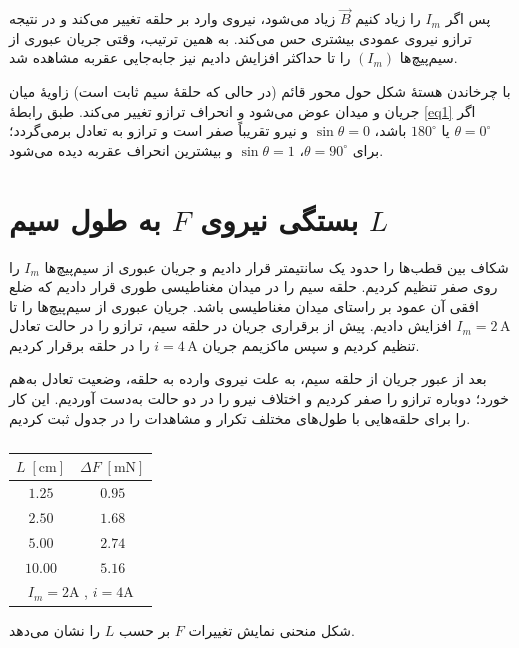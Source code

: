 \documentclass[a4paper, 11pt]{article}
\begin{document}
پس اگر $I_m$  را زیاد کنیم $\vec B$ زیاد می‌شود، نیروی وارد بر حلقه تغییر می‌کند و در نتیجه ترازو نیروی عمودی بیشتری حس می‌کند. به همین ترتیب، وقتی جریان عبوری از سیم‌پیچ‌ها $(I_m)$ را تا حداکثر  افزایش دادیم نیز جابه‌جایی عقربه مشاهده شد.

با چرخاندن هستهٔ  شکل حول محور قائم (در حالی که حلقهٔ سیم ثابت است) زاویهٔ میان جریان و میدان عوض می‌شود و انحراف ترازو تغییر می‌کند. طبق رابطهٔ \ref{eq1} اگر $\theta = 0^\circ$ یا $180^\circ$ باشد، $\sin\theta = 0$ و نیرو تقریباً صفر است و ترازو به تعادل برمی‌گردد؛ برای $\theta = 90^\circ$، $\sin\theta = 1$ و بیشترین انحراف عقربه دیده می‌شود.

\section{بستگی نیروی $F$ به طول سیم $L$}

شکاف بین قطب‌ها را حدود یک سانتیمتر قرار دادیم و جریان عبوری از سیم‌پیچ‌ها $I_m$ را روی صفر تنظیم کردیم. حلقه سیم را در میدان مغناطیسی طوری قرار دادیم که ضلع افقی آن عمود بر راستای میدان مغناطیسی باشد. جریان عبوری از سیم‌پیچ‌ها را تا $I_m=2\,\mathrm{A}$ افزایش دادیم. پیش از برقراری جریان در حلقه سیم، ترازو را در حالت تعادل تنظیم کردیم و سپس ماکزیمم جریان $i=4\,\mathrm{A}$ را در حلقه برقرار کردیم.

بعد از عبور جریان از حلقه سیم، به علت نیروی وارده به حلقه، وضعیت تعادل به‌هم خورد؛ دوباره ترازو را صفر کردیم و اختلاف نیرو را در دو حالت به‌دست آوردیم. این کار را برای حلقه‌هایی با طول‌های مختلف تکرار و مشاهدات را در جدول ثبت کردیم.  

\begin{table}[h!]
\caption{}
\label{tab2}
\centering
\begin{tabular}{cc}
\hline
$L \;[\mathrm{cm}]$ & $\Delta F \;[\mathrm{mN}]$ \\
\hline
$1.25$ & $0.95$ \\
$2.50$ & $1.68$ \\
$5.00$ & $2.74$ \\
$10.00$ & $5.16$ \\
\hline
\multicolumn{2}{c}{$I_m = 2\mathrm{A}$ , $i = 4\mathrm{A}$}
\end{tabular}
\end{table}

شکل منحنی نمایش تغییرات $F$ بر حسب $L$ را نشان می‌دهد.
\end{document}
